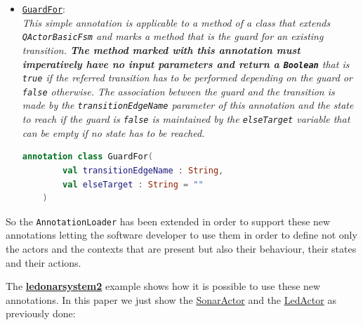 \begin{itemize}
	\item \href{https://github.com/LM-96/QA-Extensions/blob/main/it.unibo.qakactor/src/main/kotlin/annotations/Transitions.kt}{\textcolor{YellowOrange}{\underline{\texttt{GuardFor}}}}:\\
	\textit{This simple annotation is applicable to a method of a class that extends \texttt{QActorBasicFsm} and marks a method that is the \textit{guard} for an existing transition. \textbf{The method marked with this annotation must imperatively have no input parameters and return a \texttt{Boolean}} that is \texttt{true} if the referred transition has to be performed depending on the guard or \texttt{false} otherwise. The association between the guard and the transition is made by the \texttt{transitionEdgeName} parameter of this annotation and the state to reach if the guard is \texttt{false} is maintained by the \texttt{elseTarget} variable that can be empty if no state has to be reached.}
	\begin{lstlisting}[numbers=none,language=Kotlin]
		annotation class GuardFor(
		val transitionEdgeName : String,
		val elseTarget : String = ""
	)
	\end{lstlisting}
\end{itemize}

So the \texttt{AnnotationLoader} has been extended in order to support these new annotations letting the software developer to use them in order to define not only the actors and the contexts that are present but also their behaviour, their states and their actions.

The \href{https://github.com/LM-96/QA-Extensions/tree/main/it.unibo.ledsonardemo2}{\textcolor{Emerald}{\textbf{ledonarsystem2}}} example shows how it is possible to use these new annotations.
In this paper we just show the \href{https://github.com/LM-96/QA-Extensions/blob/main/it.unibo.ledsonardemo0/src/main/kotlin/it/unibo/ledsonardemo2/actors/SonarActor.kt}{SonarActor} and the \href{https://github.com/LM-96/QA-Extensions/blob/main/it.unibo.ledsonardemo0/src/main/kotlin/it/unibo/ledsonardemo2/actors/LedActor.kt}{LedActor} as previously done:

